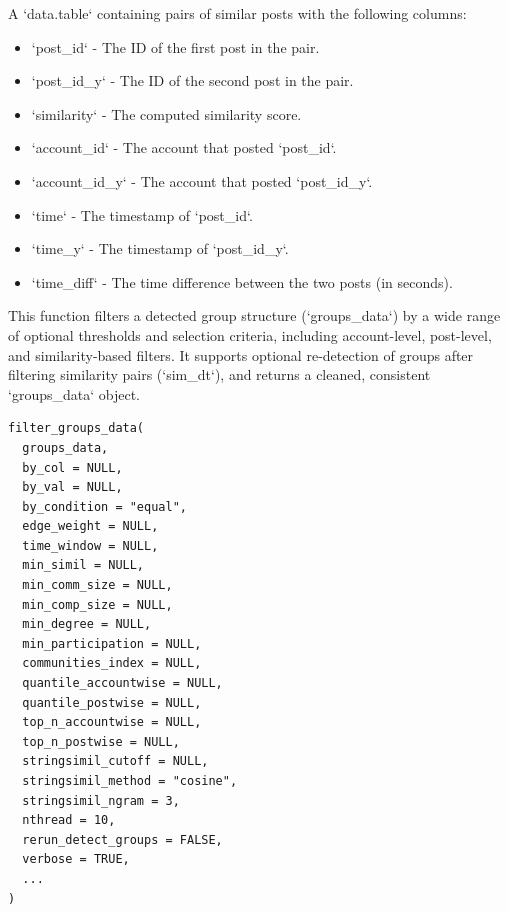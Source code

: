 \documentclass[a4paper]{book}
\begin{document}
%
\begin{Value}
A `data.table` containing pairs of similar posts with the following columns:
\begin{itemize}

\item{} `post\_id` - The ID of the first post in the pair.
\item{} `post\_id\_y` - The ID of the second post in the pair.
\item{} `similarity` - The computed similarity score.
\item{} `account\_id` - The account that posted `post\_id`.
\item{} `account\_id\_y` - The account that posted `post\_id\_y`.
\item{} `time` - The timestamp of `post\_id`.
\item{} `time\_y` - The timestamp of `post\_id\_y`.
\item{} `time\_diff` - The time difference between the two posts (in seconds).

\end{itemize}

\end{Value}
%
\begin{Description}
This function filters a detected group structure (`groups\_data`) by a wide range of optional thresholds
and selection criteria, including account-level, post-level, and similarity-based filters. It supports
optional re-detection of groups after filtering similarity pairs (`sim\_dt`), and returns a cleaned, 
consistent `groups\_data` object.
\end{Description}
%
\begin{Usage}
\begin{verbatim}
filter_groups_data(
  groups_data,
  by_col = NULL,
  by_val = NULL,
  by_condition = "equal",
  edge_weight = NULL,
  time_window = NULL,
  min_simil = NULL,
  min_comm_size = NULL,
  min_comp_size = NULL,
  min_degree = NULL,
  min_participation = NULL,
  communities_index = NULL,
  quantile_accountwise = NULL,
  quantile_postwise = NULL,
  top_n_accountwise = NULL,
  top_n_postwise = NULL,
  stringsimil_cutoff = NULL,
  stringsimil_method = "cosine",
  stringsimil_ngram = 3,
  nthread = 10,
  rerun_detect_groups = FALSE,
  verbose = TRUE,
  ...
)
\end{verbatim}
\end{Usage}
%
\end{document}
